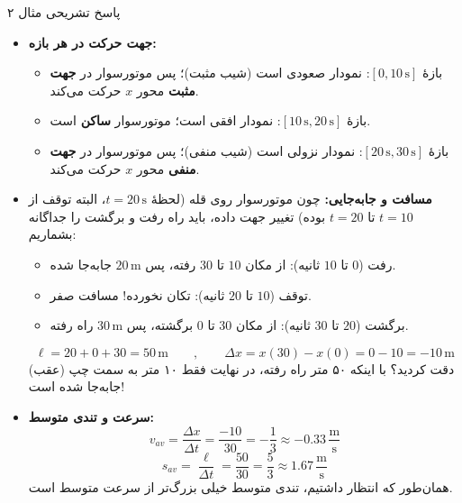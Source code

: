 \documentclass[12pt, a4paper]{article}
\begin{document}
\begin{answerbox}{پاسخ تشریحی مثال ۲}

\begin{itemize}
    \item[الف)] \textbf{جهت حرکت در هر بازه:}
    \begin{itemize}
        \item بازهٔ $[0, 10\,\text{s}]$: نمودار صعودی است (شیب مثبت)؛ پس موتورسوار در \textbf{جهت مثبت} محور $x$ حرکت می‌کند.
        \item بازهٔ $[10\,\text{s}, 20\,\text{s}]$: نمودار افقی است؛ موتورسوار \textbf{ساکن} است.
        \item بازهٔ $[20\,\text{s}, 30\,\text{s}]$: نمودار نزولی است (شیب منفی)؛ پس موتورسوار در \textbf{جهت منفی} محور $x$ حرکت می‌کند.
    \end{itemize}

    \item[ب)] \textbf{مسافت و جابه‌جایی:} چون موتورسوار روی قله (لحظهٔ $t=20\,\text{s}$، البته توقف از $t=10$ تا $t=20$ بوده) تغییر جهت داده، باید راه رفت و برگشت را جداگانه بشماریم:
    \begin{itemize}
        \item رفت ($0$ تا $10$ ثانیه): از مکان $10$ تا $30$ رفته، پس $20\,\text{m}$ جابه‌جا شده.
        \item توقف ($10$ تا $20$ ثانیه): تکان نخورده! مسافت صفر.
        \item برگشت ($20$ تا $30$ ثانیه): از مکان $30$ تا $0$ برگشته، پس $30\,\text{m}$ راه رفته.
    \end{itemize}
    \[
    \ell = 20 + 0 + 30 = 50\,\text{m} \qquad , \qquad \Delta x = x(30) - x(0) = 0 - 10 = -10\,\text{m}
    \]
    دقت کردید؟ با اینکه ۵۰ متر راه رفته، در نهایت فقط ۱۰ متر به سمت چپ (عقب) جابه‌جا شده است!

    \item[پ)] \textbf{سرعت و تندی متوسط:}
    \[
    v_{av} = \frac{\Delta x}{\Delta t} = \frac{-10}{30} = -\frac{1}{3} \approx -0.33\,\frac{\text{m}}{\text{s}}
    \]
    \[
    s_{av} = \frac{\ell}{\Delta t} = \frac{50}{30} = \frac{5}{3} \approx 1.67\,\frac{\text{m}}{\text{s}}
    \]
    همان‌طور که انتظار داشتیم، تندی متوسط خیلی بزرگ‌تر از سرعت متوسط است.
\end{itemize}
\end{answerbox}

\end{document}
